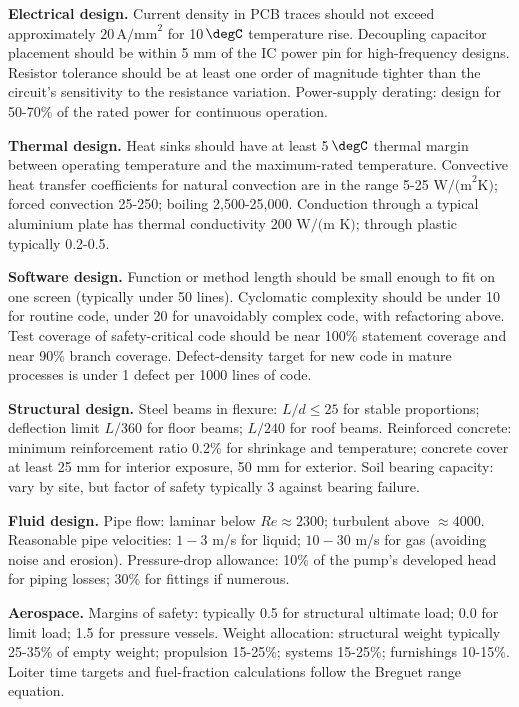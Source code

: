 \textbf{Electrical design.} Current density in PCB traces should not exceed approximately $20\,\text{A/mm}^2$ for 10$\,\degC$ temperature rise. Decoupling capacitor placement should be within 5 mm of the IC power pin for high-frequency designs. Resistor tolerance should be at least one order of magnitude tighter than the circuit's sensitivity to the resistance variation. Power-supply derating: design for 50-70\% of the rated power for continuous operation.

\textbf{Thermal design.} Heat sinks should have at least 5$\,\degC$ thermal margin between operating temperature and the maximum-rated temperature. Convective heat transfer coefficients for natural convection are in the range 5-25 $\text{W/(m}^2\text{K)}$; forced convection 25-250; boiling 2,500-25,000. Conduction through a typical aluminium plate has thermal conductivity 200 $\text{W/(m K)}$; through plastic typically 0.2-0.5.

\textbf{Software design.} Function or method length should be small enough to fit on one screen (typically under 50 lines). Cyclomatic complexity should be under 10 for routine code, under 20 for unavoidably complex code, with refactoring above. Test coverage of safety-critical code should be near 100\% statement coverage and near 90\% branch coverage. Defect-density target for new code in mature processes is under 1 defect per 1000 lines of code.

\textbf{Structural design.} Steel beams in flexure: $L/d \leq 25$ for stable proportions; deflection limit $L/360$ for floor beams; $L/240$ for roof beams. Reinforced concrete: minimum reinforcement ratio 0.2\% for shrinkage and temperature; concrete cover at least 25 mm for interior exposure, 50 mm for exterior. Soil bearing capacity: vary by site, but factor of safety typically 3 against bearing failure.

\textbf{Fluid design.} Pipe flow: laminar below $Re \approx 2300$; turbulent above $\approx 4000$. Reasonable pipe velocities: $1-3$ m/s for liquid; $10-30$ m/s for gas (avoiding noise and erosion). Pressure-drop allowance: 10\% of the pump's developed head for piping losses; 30\% for fittings if numerous.

\textbf{Aerospace.} Margins of safety: typically 0.5 for structural ultimate load; 0.0 for limit load; 1.5 for pressure vessels. Weight allocation: structural weight typically 25-35\% of empty weight; propulsion 15-25\%; systems 15-25\%; furnishings 10-15\%. Loiter time targets and fuel-fraction calculations follow the Breguet range equation.

